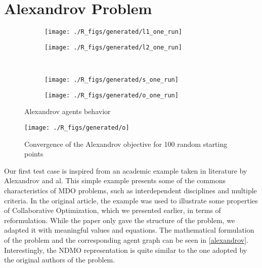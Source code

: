 \section{Alexandrov Problem}

\begin{figure}[]
\centering
  	\begin{subfigure}[b]{0.4\textwidth}
		\centering
		\texttt{[image: ./R\_figs/generated/l1\_one\_run]}
		\label{alexandrov_res_one:l1}
	\end{subfigure}
	\begin{subfigure}[b]{0.4\textwidth}
		\centering
		\texttt{[image: ./R\_figs/generated/l2\_one\_run]}
		\label{alexandrov_res_one:l2}
	\end{subfigure}
	\vspace{-20pt}
	\\
	\begin{subfigure}[b]{0.4\textwidth}
		\centering
		\texttt{[image: ./R\_figs/generated/s\_one\_run]}
		\label{alexandrov_res_one:s}
	\end{subfigure}
	\begin{subfigure}[b]{0.4\textwidth}
		\centering
		\texttt{[image: ./R\_figs/generated/o\_one\_run]}
		\label{alexandrov_res_one:o}
	\end{subfigure}
	
	\caption{Alexandrov agents behavior}
	\label{alexandrov_res_one}

\end{figure}

\begin{wrapfigure}{R}{0.4\textwidth}
    \texttt{[image: ./R\_figs/generated/o]}
	\caption{Convergence of the Alexandrov objective for 100 random starting points}
	\label{alexandrov_res}
\end{wrapfigure}

Our first test case is inspired from an academic example taken in literature by Alexandrov and al\cite{alexandrov2002analytical}. This simple example presents some of the commons characteristics of MDO problems, such as interdependent disciplines and multiple criteria. In the original article, the example was used to illustrate some properties of Collaborative Optimization, which we presented earlier, in terms of reformulation. While the paper only gave the structure of the problem, we adapted it with meaningful values and equations.
The mathematical formulation of the problem and the corresponding agent graph can be seen in \figurename \ref{alexandrov}. Interestingly, the NDMO representation is quite similar to the one adopted by the original authors of the problem.

